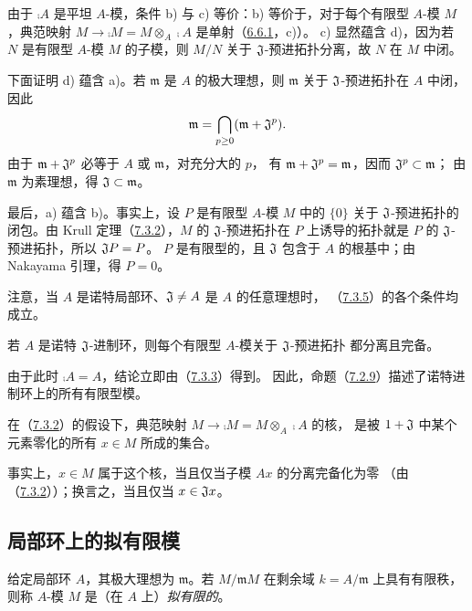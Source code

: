 由于 $\comp A$ 是平坦 $A$-模，条件 b) 与 c) 等价：b) 等价于，对于每个有限型
$A$-模 $M$，典范映射 $M\to\comp M=M\otimes_A\comp A$ 是单射（\hyperlink{para:0:6.6.1}{6.6.1}，c)）。
c) 显然蕴含 d)，因为若 $N$ 是有限型 $A$-模 $M$ 的子模，则 $M/N$ 关于
$\mathfrak J$-预进拓扑分离，故 $N$ 在 $M$ 中闭。

下面证明 d) 蕴含 a)。若 $\mathfrak m$ 是 $A$ 的极大理想，则
$\mathfrak m$ 关于 $\mathfrak J$-预进拓扑在 $A$ 中闭，因此
\[
 \mathfrak m=\bigcap_{p\geq0}(\mathfrak m+\mathfrak J^p).
\]
由于 $\mathfrak m+\mathfrak J^p$ 必等于 $A$ 或 $\mathfrak m$，对充分大的 $p$，
有 $\mathfrak m+\mathfrak J^p=\mathfrak m$，因而 $\mathfrak J^p\subset\mathfrak m$；
由 $\mathfrak m$ 为素理想，得 $\mathfrak J\subset\mathfrak m$。

最后，a) 蕴含 b)。事实上，设 $P$ 是有限型 $A$-模 $M$ 中的 $\{0\}$ 关于
$\mathfrak J$-预进拓扑的闭包。由 Krull 定理（\hyperlink{para:0:7.3.2}{7.3.2}），$M$ 的 $\mathfrak J$-预进拓扑在
$P$ 上诱导的拓扑就是 $P$ 的 $\mathfrak J$-预进拓扑，所以 $\mathfrak J P=P$。
$P$ 是有限型的，且 $\mathfrak J$ 包含于 $A$ 的根基中；由 Nakayama 引理，得 $P=0$。

注意，当 $A$ 是诺特局部环、$\mathfrak J\ne A$ 是 $A$ 的任意理想时，
（\hyperlink{para:0:7.3.5}{7.3.5}）的各个条件均成立。

若 $A$ 是诺特 $\mathfrak J$-进制环，则每个有限型 $A$-模关于 $\mathfrak J$-预进拓扑
都分离且完备。

由于此时 $\comp A=A$，结论立即由（\hyperlink{para:0:7.3.3}{7.3.3}）得到。
因此，命题（\hyperlink{para:0:7.2.9}{7.2.9}）描述了诺特进制环上的所有有限型模。

在（\hyperlink{para:0:7.3.2}{7.3.2}）的假设下，典范映射 $M\to\comp M=M\otimes_A\comp A$ 的核，
是被 $1+\mathfrak J$ 中某个元素零化的所有 $x\in M$ 所成的集合。

事实上，$x\in M$ 属于这个核，当且仅当子模 $Ax$ 的分离完备化为零
（由（\hyperlink{para:0:7.3.2}{7.3.2}））；换言之，当且仅当 $x\in\mathfrak J x$。



\par

\subsection{局部环上的拟有限模}\hypertarget{heading:0:7.4}{}

给定局部环 $A$，其极大理想为 $\mathfrak m$。若 $M/\mathfrak mM$ 在剩余域
$k=A/\mathfrak m$ 上具有有限秩，则称 $A$-模 $M$ 是（在 $A$ 上）\emph{拟有限的}。

